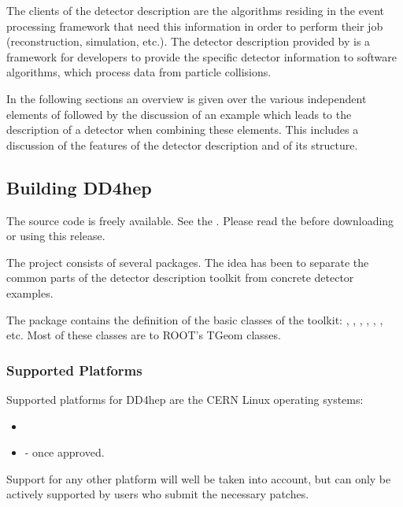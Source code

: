 \documentclass[10pt,a4paper]{article}
\begin{document}
\noindent
The clients of the detector description are the algorithms residing in the 
event processing framework that need this information in order to perform 
their job (reconstruction, simulation, etc.). 
The detector description provided by \DDhep is a framework for developers 
to provide the specific detector information to software algorithms, which 
process data from particle collisions.

\noindent
In the following sections an overview is given over the various independent
elements of \DDhep followed by the discussion of an example which leads to 
the description of a detector when combining these elements.
This includes a discussion of the features of the \DDhep detector description
and of its structure. 

\subsection{Building DD4hep}
\label{sec:dd4hep-user-manual-building}

\noindent
The \DDhep source code is freely available. See the 
.
Please read the  
before downloading or using this release.

\noindent
The \DDhep project consists of several packages. The idea 
has been to separate the common parts of 
the detector description toolkit from concrete detector examples. 

\noindent
The package {} contains the definition of the basic classes 
of the toolkit: , , , ,
, , etc. Most of these classes are  
to ROOT's TGeom classes.

\subsubsection{Supported Platforms}
\label{sec:dd4hep-user-manual-platforms}
\noindent
Supported platforms for DD4hep are the CERN Linux operating systems:
\begin{itemize}
\item {}   
\item {}    - once approved.
\end{itemize}
Support for any other platform will well be taken into account, but can only
be actively supported by users who submit the necessary patches.
\end{document}
